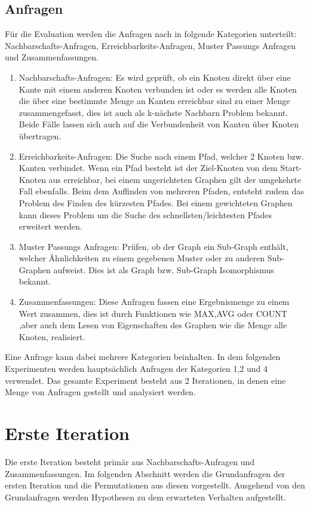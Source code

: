 \subsection{Anfragen}
Für die Evaluation werden die Anfragen nach  \parencite{angles2012comparison}  in folgende Kategorien unterteilt: Nachbarschafts-Anfragen, Erreichbarkeits-Anfragen, Muster Passungs Anfragen und  Zusammenfassungen. 
\begin{enumerate}
	\item Nachbarschafts-Anfragen: Es wird geprüft, ob ein Knoten direkt über eine  Kante mit einem anderen Knoten verbunden ist oder  es werden alle Knoten die über eine bestimmte Menge an Kanten erreichbar sind zu einer Menge zusammengefasst, dies ist auch als k-nächste Nachbarn Problem bekannt. Beide Fälle lassen sich auch auf die Verbundenheit von Kanten über Knoten übertragen.
	\item Erreichbarkeits-Anfragen: Die Suche nach einem Pfad, welcher 2 Knoten bzw. Kanten verbindet. Wenn ein Pfad besteht ist der Ziel-Knoten von dem Start-Knoten aus erreichbar, bei einem ungerichteten Graphen gilt der umgekehrte Fall ebenfalls. Beim dem Auffinden von mehreren Pfaden, entsteht zudem das Problem des Finden des kürzesten Pfades. Bei einem gewichteten Graphen kann dieses Problem um die Suche des schnellsten/leichtesten Pfades  erweitert werden. 
	\item Muster Passungs Anfragen: Prüfen, ob der Graph ein Sub-Graph enthält, welcher Ähnlichkeiten zu einem gegebenen Muster oder zu anderen Sub-Graphen aufweist. Dies ist als Graph bzw. Sub-Graph Isomorphismus bekannt. 
	\item Zusammenfassungen: Diese Anfragen fassen eine Ergebnismenge zu einem Wert zusammen, dies ist durch Funktionen wie MAX,AVG oder COUNT ,aber auch dem Lesen von Eigenschaften des Graphen wie die Menge alle Knoten, realisiert. 
\end{enumerate}

Eine Anfrage kann dabei mehrere Kategorien beinhalten. In dem folgenden Experimenten werden hauptsächlich Anfragen der Kategorien 1,2 und 4 verwendet. Das gesamte Experiment besteht aus 2 Iterationen, in denen eine Menge von Anfragen gestellt und analysiert werden. \newline
\section{Erste Iteration}
Die erste Iteration besteht primär aus Nachbarschafts-Anfragen und Zusammenfassungen. Im folgenden Abschnitt werden die Grundanfragen der ersten Iteration und die Permutationen aus diesen vorgestellt. Ausgehend von den Grundanfragen werden Hypothesen zu dem erwarteten Verhalten aufgestellt.
